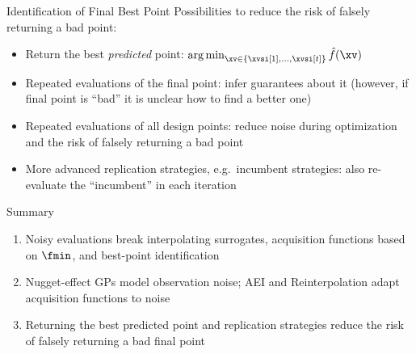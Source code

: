 \documentclass[main]{subfiles}
\begin{document}

\begin{frame}{Identification of Final Best Point}
    Possibilities to reduce the risk of falsely returning a bad point:
    \begin{itemize}
        \item Return the best \emph{predicted} point: $\argmin_{\xv \in \{\xvsi[1], \ldots, \xvsi[t]\}} \fh(\xv)$
        \item Repeated evaluations of the final point: infer guarantees about it (however, if final point is ``bad'' it is unclear how to find a better one)
        \item Repeated evaluations of all design points: reduce noise during optimization and the risk of falsely returning a bad point
        \item More advanced replication strategies, e.g.\ incumbent strategies: also re-evaluate the ``incumbent'' in each iteration
    \end{itemize}
\end{frame}


\begin{frame}{Summary}
\begin{enumerate}
    \item Noisy evaluations break interpolating surrogates, acquisition functions based on $\fmin$, and best-point identification
    \item Nugget-effect GPs model observation noise; AEI and Reinterpolation adapt acquisition functions to noise
    \item Returning the best predicted point and replication strategies reduce the risk of falsely returning a bad final point
\end{enumerate}
\end{frame}
\end{document}
